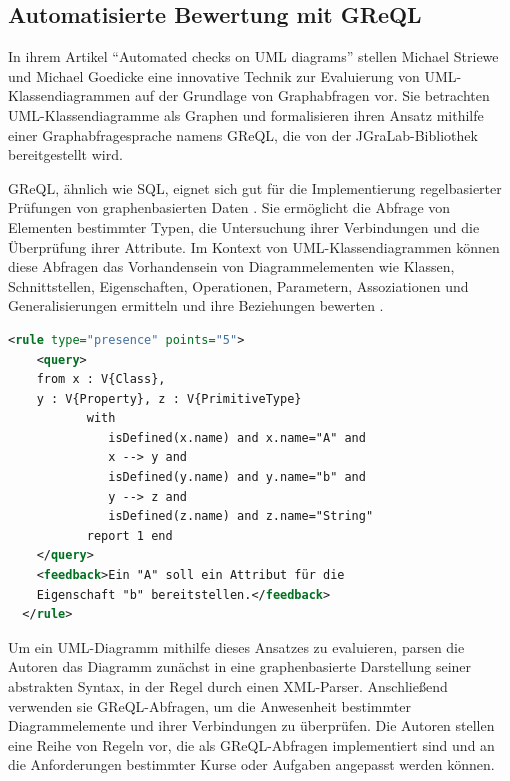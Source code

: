 \subsection{Automatisierte Bewertung mit GReQL}\label{subsec:automatisierte-bewertung-mit-greql}

In ihrem Artikel ``Automated checks on UML diagrams'' \cite{striewe2011automated} stellen Michael Striewe und Michael Goedicke eine innovative Technik zur Evaluierung von UML-Klassendiagrammen auf der Grundlage von Graphabfragen vor. Sie betrachten UML-Klassendiagramme als Graphen und formalisieren ihren Ansatz mithilfe einer Graphabfragesprache namens GReQL, die von der JGraLab-Bibliothek bereitgestellt wird.

\ac{GReQL}, ähnlich wie SQL, eignet sich gut für die Implementierung regelbasierter Prüfungen von graphenbasierten Daten \cite{striewe2014automated}. Sie ermöglicht die Abfrage von Elementen bestimmter Typen, die Untersuchung ihrer Verbindungen und die Überprüfung ihrer Attribute. Im Kontext von UML-Klassendiagrammen können diese Abfragen das Vorhandensein von Diagrammelementen wie Klassen, Schnittstellen, Eigenschaften, Operationen, Parametern, Assoziationen und Generalisierungen ermitteln und ihre Beziehungen bewerten \cite{striewe2011automated}.

\begin{lstlisting}[caption={[Codebeispiel] Codebeispiel in GReQL}, label={lst:greql}, float=!ht, language=xml]
  <rule type="presence" points="5">
    <query>
    from x : V{Class},
    y : V{Property}, z : V{PrimitiveType}
           with
              isDefined(x.name) and x.name="A" and
              x --> y and
              isDefined(y.name) and y.name="b" and
              y --> z and
              isDefined(z.name) and z.name="String"
           report 1 end
    </query>
    <feedback>Ein "A" soll ein Attribut für die
    Eigenschaft "b" bereitstellen.</feedback>
  </rule>
\end{lstlisting}

Um ein UML-Diagramm mithilfe dieses Ansatzes zu evaluieren, parsen die Autoren das Diagramm zunächst in eine graphenbasierte Darstellung seiner abstrakten Syntax, in der Regel durch einen XML-Parser. Anschließend verwenden sie \ac{GReQL}-Abfragen, um die Anwesenheit bestimmter Diagrammelemente und ihrer Verbindungen zu überprüfen. Die Autoren stellen eine Reihe von Regeln vor, die als \ac{GReQL}-Abfragen implementiert sind und an die Anforderungen bestimmter Kurse oder Aufgaben angepasst werden können.

